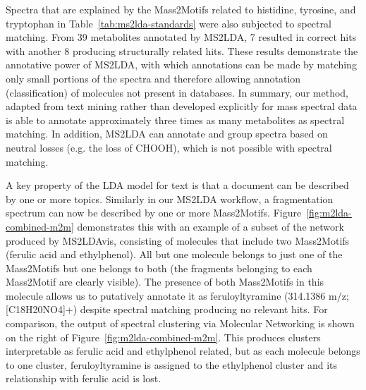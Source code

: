 Spectra that are explained by the Mass2Motifs related to histidine, tyrosine, and tryptophan in Table~\ref{tab:ms2lda-standards} were also subjected to spectral matching. From 39 metabolites annotated by MS2LDA, 7 resulted in correct hits with another 8 producing structurally related hits. These results demonstrate the annotative power of MS2LDA, with which annotations can be made by matching only small portions of the spectra and therefore allowing annotation (classification) of molecules not present in databases. In summary, our method, adapted from text mining rather than developed explicitly for mass spectral data is able to annotate approximately three times as many metabolites as spectral matching. In addition, MS2LDA can annotate and group spectra based on neutral losses (e.g. the loss of CHOOH), which is not possible with spectral matching.

A key property of the LDA model for text is that a document can be described by one or more topics. Similarly in our MS2LDA workflow, a fragmentation spectrum can now be described by one or more Mass2Motifs. Figure~\ref{fig:m2lda-combined-m2m} demonstrates this with an example of a subset of the network produced by MS2LDAvis, consisting of molecules that include two Mass2Motifs (ferulic acid and ethylphenol). All but one molecule belongs to just one of the Mass2Motifs but one belongs to both (the fragments belonging to each Mass2Motif are clearly visible). The presence of both Mass2Motifs in this molecule allows us to putatively annotate it as feruloyltyramine (314.1386 m/z; [C18H20NO4]+) despite spectral matching producing no relevant hits. For comparison, the output of spectral clustering via Molecular Networking is shown on the right of Figure~\ref{fig:m2lda-combined-m2m}. This produces clusters interpretable as ferulic acid and ethylphenol related, but as each molecule belongs to one cluster, feruloyltyramine is assigned to the ethylphenol cluster and its relationship with ferulic acid is lost. 



